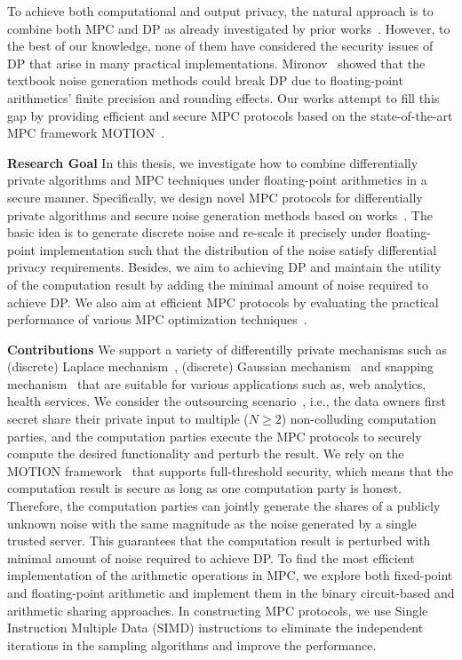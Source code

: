 To achieve both computational and output privacy, the natural approach is to combine both MPC and DP as already investigated by prior works~\cite{eigner2014differentially, pettai2015combining, byrd2020differentially}. However, to the best of our knowledge, none of them have considered the security issues of DP that arise in many practical implementations. Mironov~\cite{mironov2012significance} showed that the textbook noise generation methods could break DP due to floating-point arithmetics' finite precision and rounding effects. Our works attempt to fill this gap by providing efficient and secure MPC protocols based on the state-of-the-art MPC framework MOTION~\cite{braun2020motion}.

\textbf{Research Goal}
In this thesis, we investigate how to combine differentially private algorithms and MPC techniques under floating-point arithmetics in a secure manner. Specifically, we design novel MPC protocols for differentially private algorithms and secure noise generation methods based on works~\cite{mironov2012significance,googleDP2019,canonne2020discrete}. The basic idea is to generate discrete noise and re-scale it precisely under floating-point implementation such that the distribution of the noise  satisfy differential privacy requirements. Besides, we aim to achieving DP and maintain the utility of the computation result by adding the minimal amount of noise required to achieve DP. We also aim at efficient MPC protocols by evaluating the practical performance of various MPC optimization techniques~\cite{braun2020motion}.

\textbf{Contributions}
We support a variety of differentilly private mechanisms such as (discrete) Laplace mechanism~\cite{chan2012privacy,ghosh2012universally,dwork2014algorithmic}, (discrete) Gaussian mechanism~\cite{dwork2014algorithmic, canonne2020discrete} and snapping mechanism~\cite{mironov2012significance} that are suitable for various applications such as, web analytics, health services.
We consider the outsourcing scenario~\cite{kamara2011secure}, i.e., the data owners first secret share their private input to multiple ($N \geq 2$) non-colluding computation parties, and the computation parties execute the MPC protocols to securely compute the desired functionality and perturb the result. We rely on the MOTION framework~\cite{braun2020motion} that supports full-threshold security, which means that the computation result is secure as long as one computation party is honest. Therefore, the computation parties can jointly generate the shares of a publicly unknown noise with the same magnitude as the noise generated by a single trusted server.
This guarantees that the computation result is perturbed with minimal amount of noise required to achieve DP.
To find the most efficient implementation of the arithmetic operations in MPC, we explore both fixed-point and floating-point arithmetic and implement them in the binary circuit-based and arithmetic sharing approaches.
In constructing MPC protocols, we use Single Instruction Multiple Data (SIMD) instructions to eliminate the independent iterations in the sampling algorithms and improve the performance.

